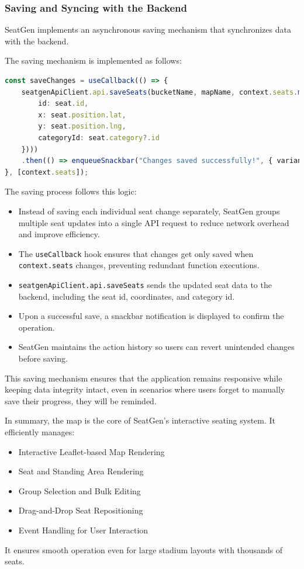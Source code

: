 \subsubsection{Saving and Syncing with the Backend}
SeatGen implements an asynchronous saving mechanism that synchronizes data with the backend.

The saving mechanism is implemented as follows:
\newpage
\begin{lstlisting}[language=TypeScript, caption=Save Mechanism, label=lst:batch-save-seats]
const saveChanges = useCallback(() => {
    seatgenApiClient.api.saveSeats(bucketName, mapName, context.seats.map(seat => ({
        id: seat.id,
        x: seat.position.lat,
        y: seat.position.lng,
        categoryId: seat.category?.id
    })))
    .then(() => enqueueSnackbar("Changes saved successfully!", { variant: "success" }));
}, [context.seats]);
\end{lstlisting}

The saving process follows this logic:
\begin{itemize}
    \item Instead of saving each individual seat change separately, SeatGen groups multiple seat updates into a single API request to reduce network overhead and improve efficiency.
    \item The \texttt{useCallback} hook ensures that changes get only saved when \texttt{context.seats} changes, preventing redundant function executions.
    \item \texttt{seatgenApiClient.api.saveSeats} sends the updated seat data to the backend, including the seat id, coordinates, and category id.
    \item Upon a successful save, a snackbar notification is displayed to confirm the operation.
    \item SeatGen maintains the action history so users can revert unintended changes before saving.
\end{itemize}

This saving mechanism ensures that the application remains responsive while keeping data integrity intact, even in scenarios where users forget to manually save their progress, they will be reminded.

In summary, the map is the core of SeatGen’s interactive seating system. It efficiently manages:
\begin{itemize}
    \item Interactive Leaflet-based Map Rendering
    \item Seat and Standing Area Rendering
    \item Group Selection and Bulk Editing
    \item Drag-and-Drop Seat Repositioning
    \item Event Handling for User Interaction
\end{itemize}

It ensures smooth operation even for large stadium layouts with thousands of seats.

